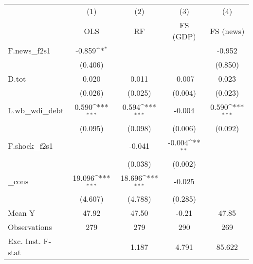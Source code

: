 {
\def\sym#1{\ifmmode^{#1}\else\(^{#1}\)\fi}
\begin{tabular}{l*{4}{c}}
\toprule
            &\multicolumn{1}{c}{(1)}&\multicolumn{1}{c}{(2)}&\multicolumn{1}{c}{(3)}&\multicolumn{1}{c}{(4)}\\
            &\multicolumn{1}{c}{OLS}&\multicolumn{1}{c}{RF}&\multicolumn{1}{c}{FS (GDP)}&\multicolumn{1}{c}{FS (news)}\\
\midrule
F.news\_f2s1 &      -0.859\sym{*}  &                     &                     &      -0.952         \\
            &     (0.406)         &                     &                     &     (0.850)         \\
\addlinespace
D.tot       &       0.020         &       0.011         &      -0.007         &       0.023         \\
            &     (0.026)         &     (0.025)         &     (0.004)         &     (0.023)         \\
\addlinespace
L.wb\_wdi\_debt&       0.590\sym{***}&       0.594\sym{***}&      -0.004         &       0.590\sym{***}\\
            &     (0.095)         &     (0.098)         &     (0.006)         &     (0.092)         \\
\addlinespace
F.shock\_f2s1&                     &      -0.041         &      -0.004\sym{**} &                     \\
            &                     &     (0.038)         &     (0.002)         &                     \\
\addlinespace
\_cons      &      19.096\sym{***}&      18.696\sym{***}&      -0.025         &                     \\
            &     (4.607)         &     (4.788)         &     (0.285)         &                     \\
\midrule
Mean Y      &       47.92         &       47.50         &       -0.21         &       47.85         \\
Observations&         279         &         279         &         290         &         269         \\
Exc. Inst. F-stat&                     &       1.187         &       4.791         &      85.622         \\
\bottomrule
\end{tabular}
}
